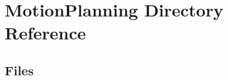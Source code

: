 \section{Motion\+Planning Directory Reference}
\label{dir_d3e392bcaf3993e705ceaf3cb2108cbd}
\subsection*{Files}
\begin{DoxyCompactItemize}
\end{DoxyCompactItemize}
